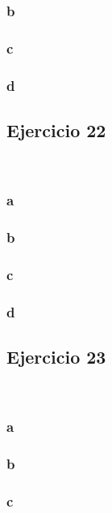 \documentclass{article}
\begin{document}
\subsubsection*{b}

\subsubsection*{c}

\subsubsection*{d}

\subsection*{Ejercicio 22}

\

\subsubsection*{a}

\subsubsection*{b}

\subsubsection*{c}

\subsubsection*{d}

\subsection*{Ejercicio 23}

\

\subsubsection*{a}

\subsubsection*{b}

\subsubsection*{c}
\end{document}
